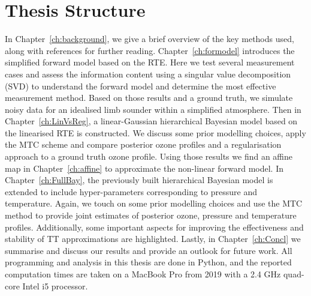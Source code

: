 \section{Thesis Structure}
In Chapter~\ref{ch:background}, we give a brief overview of the key methods used, along with references for further reading.
Chapter~\ref{ch:formodel} introduces the simplified forward model based on the RTE.
Here we test several measurement cases and assess the information content using a singular value decomposition (SVD) to understand the forward model and determine the most effective measurement method.
Based on those results and a ground truth, we simulate noisy data for an idealised limb sounder within a simplified atmosphere.
Then in Chapter~\ref{ch:LinVsReg}, a linear-Gaussian hierarchical Bayesian model based on the linearised RTE is constructed.
We discuss some prior modelling choices, apply the MTC scheme and compare posterior ozone profiles and a regularisation approach to a ground truth ozone profile.
Using those results we find an affine map in Chapter~\ref{ch:affine} to approximate the non-linear forward model.
In Chapter~\ref{ch:FullBay}, the previously built hierarchical Bayesian model is extended to include hyper-parameters corresponding to pressure and temperature.
Again, we touch on some prior modelling choices and use the MTC method to provide joint estimates of posterior ozone, pressure and temperature profiles.
Additionally, some important aspects for improving the effectiveness and stability of TT approximations are highlighted.
Lastly, in Chapter~\ref{ch:Concl} we summarise and discuss our results and provide an outlook for future work.
All programming and analysis in this thesis are done in Python, and the reported computation times are taken on a MacBook Pro from 2019 with a 2.4 GHz quad-core Intel i5 processor.
